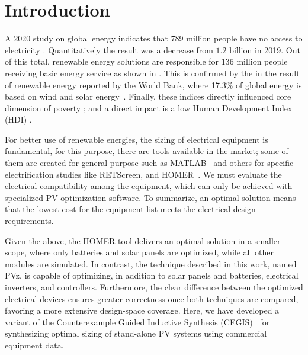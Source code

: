 \documentclass[review]{elsarticle}
\begin{document}

\maketitle

\section{Introduction}
A 2020 study on global energy indicates that $789$ million people have no access to electricity \citep{Energyprogressreport}. Quantitatively the result was a decrease from $1.2$ billion in 2019. Out of this total, renewable energy solutions are responsible for $136$ million people receiving basic energy service as shown in \cite{Energyprogressreport}. This is confirmed by the in the result of renewable energy reported by the World Bank, where 17.3\% of global energy is based on wind and solar energy~\citep{Energyprogressreport}. Finally, these indices directly influenced core dimension of poverty \citep{Hussein2012}; and a direct impact is a low Human Development Index (HDI) \citep{Coelho}. 

For better use of renewable energies, the sizing of electrical equipment is fundamental, for this purpose, there are tools available in the market; some of them are created for general-purpose such as MATLAB~\citep{Benatiallah2017} and others for specific electrification studies like RETScreen, and HOMER~\citep{Pradhan,Swarnkar}. We must evaluate the electrical compatibility among the equipment, which can only be achieved with specialized PV optimization software. To summarize, an optimal solution means that the lowest cost for the equipment list meets the electrical design requirements. 

Given the above, the HOMER tool delivers an optimal solution in a smaller scope, where only batteries and solar panels are optimized, while all other modules are simulated. In contrast, the technique described in this work, named PVz, is capable of optimizing, in addition to solar panels and batteries, electrical inverters, and controllers. Furthermore, the clear difference between the optimized electrical devices ensures greater correctness once both techniques are compared, favoring a more extensive design-space coverage. Here, we have developed a variant of the Counterexample Guided Inductive Synthesis (CEGIS)~\citep{AbateCAV2018} for synthesizing optimal sizing of stand-alone PV systems using commercial equipment data. 
\end{document}
